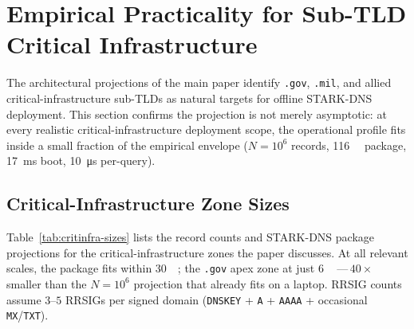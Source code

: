
\section{Empirical Practicality for Sub-TLD Critical Infrastructure}
\label{sec:critinfra-deployment}

The architectural projections of the main paper identify
\texttt{.gov}, \texttt{.mil}, and allied critical-infrastructure
sub-TLDs as natural targets for offline STARK-DNS deployment.  This
section confirms the projection is not merely asymptotic: at every
realistic critical-infrastructure deployment scope, the operational
profile fits inside a small fraction of the empirical envelope
($N=10^6$ records, \SI{116}{\mebi\byte} package, \SI{17}{\milli\second}
boot, \SI{10}{\micro\second} per-query).

\subsection{Critical-Infrastructure Zone Sizes}
\label{ssec:critinfra-sizes}

Table~\ref{tab:critinfra-sizes} lists the record counts and STARK-DNS
package projections for the critical-infrastructure zones the paper
discusses.  At all relevant scales, the package fits within
\SI{30}{\mebi\byte}; the \texttt{.gov} apex zone at just
\SI{6}{\mebi\byte}\,---\,$40\times$ smaller than the $N=10^6$
projection that already fits on a laptop.  RRSIG counts assume
$3\text{--}5$ RRSIGs per signed domain (\texttt{DNSKEY} + \texttt{A}
+ \texttt{AAAA} + occasional \texttt{MX}/\texttt{TXT}).

